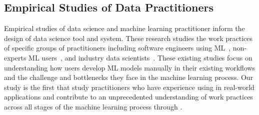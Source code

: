 \subsection{Empirical Studies of Data Practitioners}
Empirical studies of data science and machine learning practitioner inform the design of data science tool and system. These research studies the work practices of specific groups of practitioners including software engineers using ML~\cite{Amershi2020}, non-experts ML users~\cite{Yang2019}, and industry data scientists~\cite{Kandel}. These existing studies focus on understanding how users develop ML models manually in their existing workflows and the challenge and bottlenecks they face in the machine learning process. Our study is the first that study practitioners who have experience using \automl in real-world applications and contribute to an unprecedented understanding of work practices across all stages of the machine learning process through \automl. 





